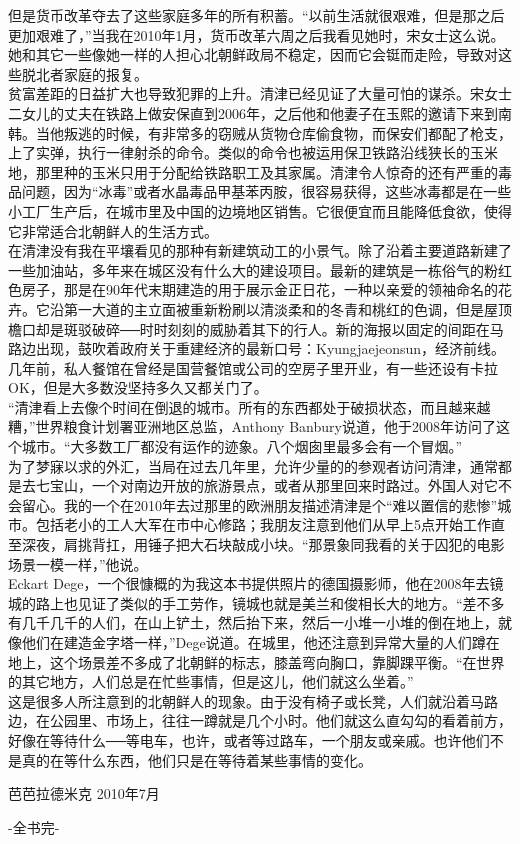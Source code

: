 但是货币改革夺去了这些家庭多年的所有积蓄。“以前生活就很艰难，但是那之后更加艰难了，”当我在2010年1月，货币改革六周之后我看见她时，宋女士这么说。她和其它一些像她一样的人担心北朝鲜政局不稳定，因而它会铤而走险，导致对这些脱北者家庭的报复。\\

贫富差距的日益扩大也导致犯罪的上升。清津已经见证了大量可怕的谋杀。宋女士二女儿的丈夫在铁路上做安保直到2006年，之后他和他妻子在玉熙的邀请下来到南韩。当他叛逃的时候，有非常多的窃贼从货物仓库偷食物，而保安们都配了枪支，上了实弹，执行一律射杀的命令。类似的命令也被运用保卫铁路沿线狭长的玉米地，那里种的玉米只用于分配给铁路职工及其家属。清津令人惊奇的还有严重的毒品问题，因为“冰毒”或者水晶毒品甲基苯丙胺，很容易获得，这些冰毒都是在一些小工厂生产后，在城市里及中国的边境地区销售。它很便宜而且能降低食欲，使得它非常适合北朝鲜人的生活方式。\\

在清津没有我在平壤看见的那种有新建筑动工的小景气。除了沿着主要道路新建了一些加油站，多年来在城区没有什么大的建设项目。最新的建筑是一栋俗气的粉红色房子，那是在90年代末期建造的用于展示金正日花，一种以亲爱的领袖命名的花卉。它沿第一大道的主立面被重新粉刷以清淡柔和的冬青和桃红的色调，但是屋顶檐口却是斑驳破碎──时时刻刻的威胁着其下的行人。新的海报以固定的间距在马路边出现，鼓吹着政府关于重建经济的最新口号：Kyungjaejeonsun，经济前线。几年前，私人餐馆在曾经是国营餐馆或公司的空房子里开业，有一些还设有卡拉OK，但是大多数没坚持多久又都关门了。\\

“清津看上去像个时间在倒退的城市。所有的东西都处于破损状态，而且越来越糟，”世界粮食计划署亚洲地区总监，Anthony Banbury说道，他于2008年访问了这个城市。“大多数工厂都没有运作的迹象。八个烟囱里最多会有一个冒烟。”\\

为了梦寐以求的外汇，当局在过去几年里，允许少量的的参观者访问清津，通常都是去七宝山，一个对南边开放的旅游景点，或者从那里回来时路过。外国人对它不会留心。我的一个在2010年去过那里的欧洲朋友描述清津是个“难以置信的悲惨”城市。包括老小的工人大军在市中心修路；我朋友注意到他们从早上5点开始工作直至深夜，肩挑背扛，用锤子把大石块敲成小块。“那景象同我看的关于囚犯的电影场景一模一样，”他说。\\

Eckart Dege，一个很慷概的为我这本书提供照片的德国摄影师，他在2008年去镜城的路上也见证了类似的手工劳作，镜城也就是美兰和俊相长大的地方。“差不多有几千几千的人们，在山上铲土，然后抬下来，然后一小堆一小堆的倒在地上，就像他们在建造金字塔一样，”Dege说道。在城里，他还注意到异常大量的人们蹲在地上，这个场景差不多成了北朝鲜的标志，膝盖弯向胸口，靠脚踝平衡。“在世界的其它地方，人们总是在忙些事情，但是这儿，他们就这么坐着。”\\

这是很多人所注意到的北朝鲜人的现象。由于没有椅子或长凳，人们就沿着马路边，在公园里、市场上，往往一蹲就是几个小时。他们就这么直勾勾的看着前方，好像在等待什么──等电车，也许，或者等过路车，一个朋友或亲戚。也许他们不是真的在等什么东西，他们只是在等待着某些事情的变化。\\

\begin{flushright}
	芭芭拉德米克 2010年7月
\end{flushright}


\begin{center}
	-全书完-
\end{center}